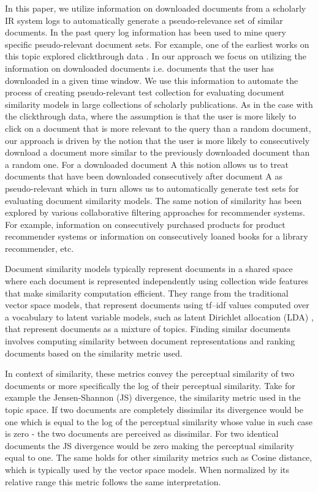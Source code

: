 \documentclass[letterpaper]{article}
\begin{document}
In this paper, we utilize information on downloaded documents from a scholarly IR system logs to automatically generate a pseudo-relevance set of similar documents. In the past query log information has been used to mine query specific pseudo-relevant document sets. For example, one of the earliest works on this topic explored clickthrough data \cite{Joachims}. In our approach we focus on utilizing the information on downloaded documents i.e. documents that the user has downloaded in a given time window. We use this information to automate the process of creating pseudo-relevant test collection for evaluating document similarity models in large collections of scholarly publications. As in the case with the clickthrough data, where the assumption is that the user is more likely to click on a document that is more relevant to the query than a random document, our approach is driven by the notion that the user is more likely to consecutively download a document more similar to the previously downloaded document than a random one. For a downloaded document A this notion allows us to treat documents that have been downloaded consecutively after document A as pseudo-relevant which in turn allows us to automatically generate test sets for evaluating document similarity models. The same notion of similarity has been explored by various collaborative filtering approaches for recommender systems. For example, information on consecutively purchased products for product recommender systems or information on consecutively loaned books for a library recommender, etc.

Document similarity models typically represent documents in a shared space where each document is represented independently using collection wide features that make similarity computation efficient. They range from the traditional vector space
 models, that represent documents using tf--idf values computed over a vocabulary \cite{Croft_book} to latent variable models, such as latent Dirichlet allocation (LDA) \cite{blei_LDA}, that represent documents as a mixture of topics. Finding similar documents involves computing similarity between document representations and ranking documents based on the similarity metric used.

In context of similarity, these metrics convey the perceptual similarity of two documents or more specifically the log of their perceptual similarity. Take for example the Jensen-Shannon (JS) divergence, the similarity metric used in the topic space. If two documents are completely dissimilar its divergence would be one which is equal to the log of the perceptual similarity whose value in such case is zero - the two documents are perceived as dissimilar. For two identical documents the JS divergence would be zero making the perceptual similarity equal to one. The same holds for other similarity metrics such as Cosine distance, which is typically used by the vector space models. When normalized by its relative range this metric follows the same interpretation. 
\end{document}
